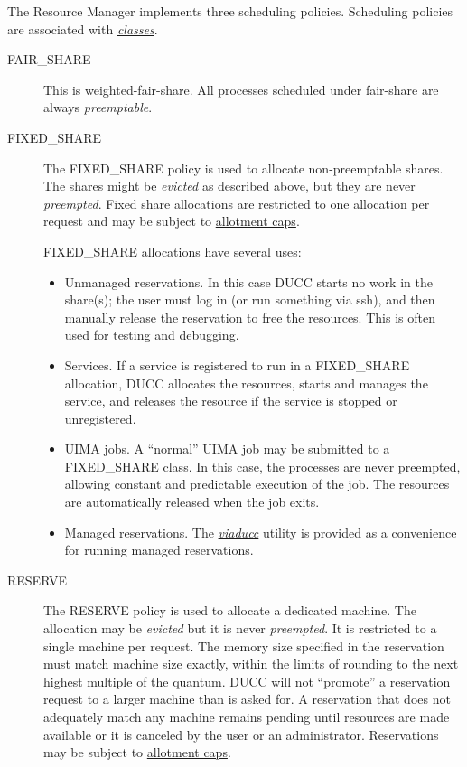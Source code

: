     The Resource Manager implements three scheduling policies. Scheduling policies are
    associated with \hyperref[sec:rm.job-classes]{\em classes}.
    \begin{description}
        \item[FAIR\_SHARE] This is weighted-fair-share.  All processes scheduled under
           fair-share are always {\em preemptable}.

        \item[FIXED\_SHARE] The FIXED\_SHARE policy is used to allocate non-preemptable
          shares.  The shares might be {\em evicted} as described above, but they are 
          never {\em preempted}.  Fixed share allocations are restricted to one
          allocation per request and may be subject to \hyperref[sec:rm.allotment]{allotment caps}.

          FIXED\_SHARE allocations have several uses:
          \begin{itemize}
            \item Unmanaged reservations.  In this case DUCC starts no work in the share(s); the user must
              log in (or run something via ssh), and then manually release the reservation to free
              the resources.  This is often used for testing and debugging.
            \item Services.  If a service is registered to run in a FIXED\_SHARE allocation,
              DUCC allocates the resources, starts and manages the service, and releases the
              resource if the service is stopped or unregistered.
            \item UIMA jobs.  A ``normal'' UIMA job may be submitted to a FIXED\_SHARE
              class.  In this case, the processes are never preempted, allowing constant and
              predictable execution of the job.  The resources are automatically released when
              the job exits.
            \item Managed reservations.  The \hyperref[sec:cli.viaducc]{\em viaducc} utility is provided 
              as a convenience for running managed reservations.
          \end{itemize}                    
          
        \item[RESERVE] The RESERVE policy is used to allocate a dedicated machine.
          The allocation may be {\em evicted} but it is never {\em preempted}. It is
          restricted to a single machine per request.  The memory size
          specified in the reservation must match machine size
          exactly, within the limits of rounding to the next highest multiple of the
          quantum.  DUCC will not ``promote'' a reservation request to a larger machine
          than is asked for.  A reservation that does not adequately match any
          machine remains pending until resources are made available or it is 
          canceled by the user or an administrator. Reservations may be
          subject to \hyperref[sec:rm.allotment]{allotment caps}.

    \end{description}
    
